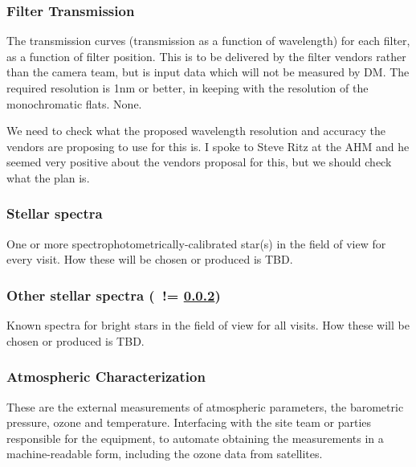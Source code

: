 \subsubsection{Filter Transmission}\label{sec:CPP:inputs:filterTransmission}
The transmission curves (transmission as a function of wavelength) for each filter, as a function of filter position. This is to be delivered by the filter vendors rather than the camera team, but is input data which will not be measured by DM. The required resolution is 1nm or better, in keeping with the resolution of the monochromatic flats.
\alg None.
\begin{note}
	We need to check what the proposed wavelength resolution and accuracy the vendors are proposing to use for this is. I spoke to Steve Ritz at the AHM and he seemed very positive about the vendors proposal for this, but we should check what the plan is.
\end{note}


\subsubsection{Stellar spectra}\label{sec:CPP:inputs:starSpectrum} 
One or more spectrophotometrically-calibrated star(s) in the field of view for every visit.
\alg How these will be chosen or produced is TBD.


\subsubsection{Other stellar spectra (\nb~!= \ref{sec:CPP:inputs:starSpectrum})}\label{sec:CPP:inputs:standardStarSpectrum}
Known spectra for bright stars in the field of view for all visits.
\alg How these will be chosen or produced is TBD.


\subsubsection{Atmospheric Characterization}\label{sec:CPP:inputs:atmosphericData}
These are the external measurements of atmospheric parameters, \eg the barometric pressure, ozone and temperature.
\alg Interfacing with the site team or parties responsible for the equipment, to automate obtaining the measurements in a machine-readable form, including the ozone data from satellites.


